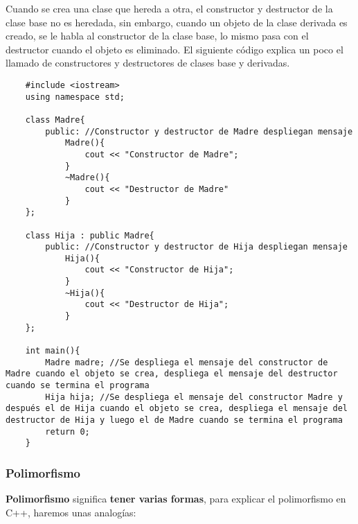 Cuando se crea una clase que hereda a otra, el constructor y destructor de la clase base no es heredada, sin embargo, cuando un objeto de la clase derivada es creado, se le habla al constructor de la clase base, lo mismo pasa con el destructor cuando el objeto es eliminado. El siguiente código explica un poco el llamado de constructores y destructores de clases base y derivadas.
\begin{lstlisting}
    #include <iostream>
    using namespace std;
    
    class Madre{
        public: //Constructor y destructor de Madre despliegan mensaje
            Madre(){
                cout << "Constructor de Madre";
            }
            ~Madre(){
                cout << "Destructor de Madre"
            }
    };
    
    class Hija : public Madre{
        public: //Constructor y destructor de Hija despliegan mensaje
            Hija(){
                cout << "Constructor de Hija";
            }
            ~Hija(){
                cout << "Destructor de Hija";
            }
    };
    
    int main(){
        Madre madre; //Se despliega el mensaje del constructor de Madre cuando el objeto se crea, despliega el mensaje del destructor cuando se termina el programa
        Hija hija; //Se despliega el mensaje del constructor Madre y después el de Hija cuando el objeto se crea, despliega el mensaje del destructor de Hija y luego el de Madre cuando se termina el programa
        return 0;
    }
\end{lstlisting}


\subsubsection{Polimorfismo}
\hspace{0.55cm}\textbf{Polimorfismo} significa \textbf{tener varias formas}, para explicar el polimorfismo en C++, haremos unas analogías:

